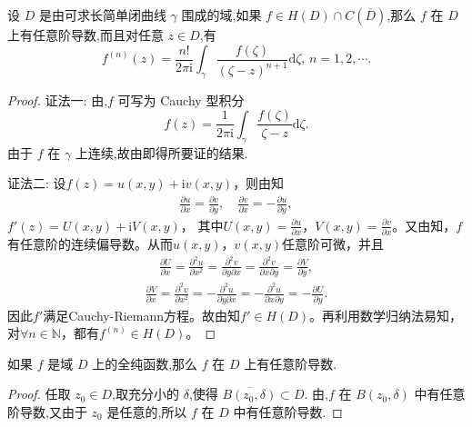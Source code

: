 \documentclass[../../main.tex]{subfiles}
\begin{document}
\begin{theorem}\label{theorem:定理3.4.3}
设 \( D \) 是由可求长简单闭曲线 \( \gamma \) 围成的域,如果 \( f \in H(D) \cap C(\overline{D}) \),那么 \( f \) 在 \( D \) 上有任意阶导数,而且对任意 \( z \in D \),有
\[
f^{(n)}(z) = \frac{n!}{2\pi \mathrm{i}} \int_{\gamma} \frac{f(\zeta)}{(\zeta - z)^{n + 1}} \mathrm{d}\zeta, \, n = 1, 2, \cdots.
\]
\end{theorem}
\begin{proof}
{\color{blue}证法一:}
由,\( f \) 可写为 Cauchy 型积分
\[
f(z) = \frac{1}{2\pi \mathrm{i}} \int_{\gamma} \frac{f(\zeta)}{\zeta - z} \mathrm{d}\zeta.
\]
由于 \( f \) 在 \( \gamma \) 上连续,故由即得所要证的结果. 

{\color{blue}证法二:}
设\( f(z) = u(x,y) + \mathrm{i}v(x,y) \)，则由知
\begin{align*}
\frac{\partial u}{\partial x} = \frac{\partial v}{\partial y},\quad \frac{\partial v}{\partial x} = -\frac{\partial u}{\partial y},
\end{align*}
\( f'(z) = U(x,y) + \mathrm{i}V(x,y) \)，
其中\( U(x,y) = \frac{\partial u}{\partial x} \)，\( V(x,y) = \frac{\partial v}{\partial x} \)。又由知，\( f \)有任意阶的连续偏导数。从而\( u(x,y) \)，\( v(x,y) \)任意阶可微，并且
\begin{align*}
\frac{\partial U}{\partial x} = \frac{\partial^2 u}{\partial x^2} = \frac{\partial^2 v}{\partial y \partial x} = \frac{\partial^2 v}{\partial x \partial y} = \frac{\partial V}{\partial y},
\end{align*}
\begin{align*}
\frac{\partial V}{\partial x} = \frac{\partial^2 v}{\partial x^2} = -\frac{\partial^2 u}{\partial y \partial x} = -\frac{\partial^2 u}{\partial x \partial y} = -\frac{\partial U}{\partial y}.
\end{align*}
因此\( f' \)满足Cauchy-Riemann方程。故由知\( f' \in H(D) \)。再利用数学归纳法易知，对\( \forall n \in \mathbb{N} \)，都有\( f^{(n)} \in H(D) \)。

\end{proof}

\begin{theorem}\label{theorem:定理3.4.4}
如果 \( f \) 是域 \( D \) 上的全纯函数,那么 \( f \) 在 \( D \) 上有任意阶导数.
\end{theorem}
\begin{proof}
任取 \( z_0 \in D \),取充分小的 \( \delta \),使得 \( \overline{B(z_0, \delta)} \subset D \). 由,\( f \) 在 \( B(z_0, \delta) \) 中有任意阶导数,又由于 \( z_0 \) 是任意的,所以 \( f \) 在 \( D \) 中有任意阶导数.

\end{proof}
\end{document}
